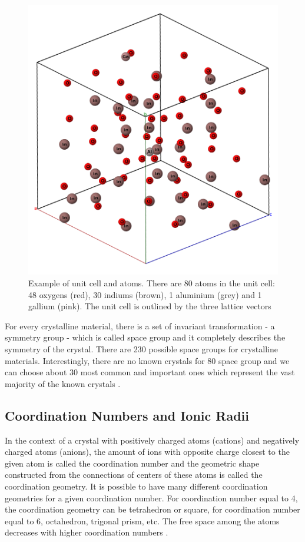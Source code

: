 \documentclass[11pt,oneside,czech,american]{book} %
\theoremstyle{plain}
\theoremstyle{definition}
\begin{document}
\begin{figure}[H]
	\centering
	\includegraphics[scale=0.35]{string_label_crop.png}
	\caption{Example of unit cell and atoms. There are 80 atoms in the unit cell: 48 oxygens (red), 30 indiums (brown), 1 aluminium (grey) and 1 gallium (pink). The unit cell is outlined by the three lattice vectors \parencite{jmol}}
	\label{alloy}
\end{figure}
For every crystalline material, there is a set of invariant transformation - a symmetry group - which is called space group and it completely describes the symmetry of the crystal. There are 230 possible space groups for crystalline materials. Interestingly, there are no known crystals for 80 space group and we can choose about 30 most common and important ones which represent the vast majority of the known crystals \parencite{kraus16}.
\subsection{Coordination Numbers and Ionic Radii} \label{numbers_radii}
In the context of a crystal with positively charged atoms (cations) and negatively charged atoms (anions), the amount of ions with opposite charge closest to the given atom is called the coordination number and the geometric shape constructed from the connections of centers of these atoms is called the coordination geometry. It is possible to have many different coordination geometries for a given coordination number. For coordination number equal to 4, the coordination geometry can be tetrahedron or square, for coordination number equal to 6, octahedron, trigonal prism, etc. The free space among the atoms decreases with higher coordination numbers \parencite{kraus16}.
\end{document}
